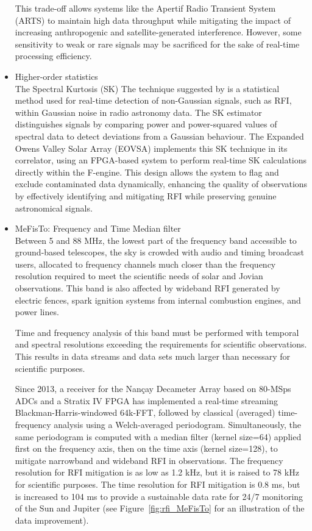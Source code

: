 \begin{itemize}
This trade-off allows systems like the Apertif Radio Transient System (ARTS) to maintain high data throughput while mitigating the impact of increasing anthropogenic and satellite-generated interference. However, some sensitivity to weak or rare signals may be sacrificed for the sake of real-time processing efficiency.
 
\item Higher-order statistics\\

The Spectral Kurtosis (SK) The technique suggested by \citep{nita2010statistics} is a statistical method used for real-time detection of non-Gaussian signals, such as RFI, within Gaussian noise in radio astronomy data. The SK estimator distinguishes signals by comparing power and power-squared values of spectral data to detect deviations from a Gaussian behaviour. The Expanded Owens Valley Solar Array (EOVSA) implements this SK technique in its correlator, using an FPGA-based system to perform real-time SK calculations directly within the F-engine. This design allows the system to flag and exclude contaminated data dynamically, enhancing the quality of observations by effectively identifying and mitigating RFI while preserving genuine astronomical signals.

\item MeFisTo: Frequency and Time Median filter\\

Between 5 and 88 MHz, the lowest part of the frequency band accessible to ground-based telescopes, the sky is crowded with audio and timing broadcast users, allocated to frequency channels much closer than the frequency resolution required to meet the scientific needs of solar and Jovian observations. This band is also affected by wideband RFI generated by electric fences, spark ignition systems from internal combustion engines, and power lines.

Time and frequency analysis of this band must be performed with temporal and spectral resolutions exceeding the requirements for scientific observations. This results in data streams and data sets much larger than necessary for scientific purposes.

Since 2013, a receiver for the Nançay Decameter Array \citep{lecacheux2013, 2017pre8.conf..455L} based on 80-MSps ADCs and a Stratix IV FPGA has implemented a real-time streaming Blackman-Harris-windowed 64k-FFT, followed by classical (averaged) time-frequency analysis using a Welch-averaged periodogram. Simultaneously, the same periodogram is computed with a median filter (kernel size=64) applied first on the frequency axis, then on the time axis (kernel size=128), to mitigate narrowband and wideband RFI in observations. The frequency resolution for RFI mitigation is as low as 1.2 kHz, but it is raised to 78 kHz for scientific purposes. The time resolution for RFI mitigation is 0.8 ms, but is increased to 104 ms to provide a sustainable data rate for 24/7 monitoring of the Sun and Jupiter (see Figure~\ref{fig:rfi_MeFisTo} for an illustration of the data improvement).


\end{itemize}
